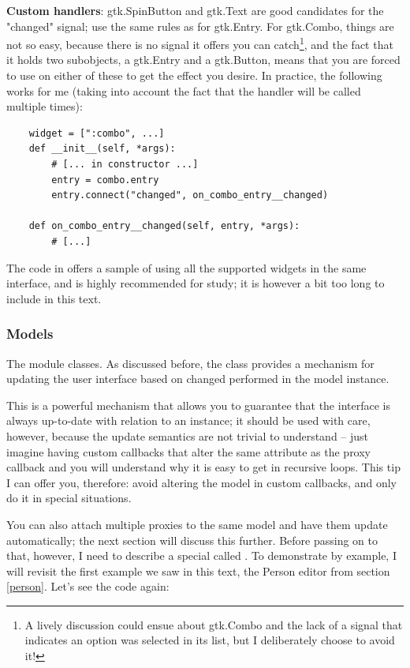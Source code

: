 \documentclass[a4paper]{howto}
\begin{document}
\begin{itemize}
{\bf Custom handlers}: gtk.SpinButton and gtk.Text are good candidates for
the "changed" signal; use the same rules as for gtk.Entry. For gtk.Combo,
things are not so easy, because there is no signal it offers you can
catch\footnote{A lively discussion could ensue about gtk.Combo and the
lack of a signal that indicates an option was selected in its list, but
I deliberately choose to avoid it!}, and the fact that it holds two
subobjects, a gtk.Entry and a gtk.Button, means that you are forced to use
 on either of these to get the effect you desire. In
practice, the following works for me (taking into account the fact that
the handler will be called multiple times):

    \begin{verbatim}
    widget = [":combo", ...]
    def __init__(self, *args):
        # [... in constructor ...]
        entry = combo.entry
        entry.connect("changed", on_combo_entry__changed)

    def on_combo_entry__changed(self, entry, *args):
        # [...]
    \end{verbatim}

\end{itemize}

The code in  offers a sample of using all the
supported widgets in the same interface, and is highly recommended for
study; it is however a bit too long to include in this text.

\subsubsection{Models}

The  module  classes. As discussed
before, the  class provides a mechanism for updating the
user interface based on changed performed in the model instance.

This is a powerful mechanism that allows you to guarantee that the
interface is always up-to-date with relation to an instance; it should
be used with care, however, because the update semantics are not trivial
to understand -- just imagine having custom callbacks that alter the
same attribute as the proxy callback and you will understand why it is
easy to get in recursive loops. This tip I can offer you, therefore:
avoid altering the model in custom callbacks, and only do it in special
situations.

You can also attach multiple proxies to the same model and have them
update automatically; the next section will discuss this further. Before
passing on to that, however, I need to describe a special 
called . To demonstrate by example, I will revisit
the first example we saw in this text, the Person editor from section
\ref{person}. Let's see the code again:
\end{document}

